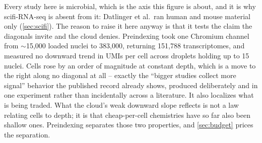 Every study here is microbial, which is the axis this figure is about, and it is
why scifi-RNA-seq is absent from it: Datlinger et al.\ ran human and mouse
material only (\cref{sec:scifi}). The reason to raise it here anyway is that it
tests the claim the diagonals invite and the cloud denies. Preindexing took one
Chromium channel from $\sim$15{,}000 loaded nuclei to 383{,}000, returning
151{,}788 transcriptomes, and measured no downward trend in UMIs per cell across
droplets holding up to 15 nuclei. Cells rose by an order of magnitude at
constant depth, which is a move to the right along no diagonal at all -- exactly
the ``bigger studies collect more signal'' behavior the published record already
shows, produced deliberately and in one experiment rather than incidentally
across a literature. It also localizes what is being traded. What the cloud's
weak downward slope reflects is not a law relating cells to depth; it is that
cheap-per-cell chemistries have so far also been shallow ones. Preindexing
separates those two properties, and \cref{sec:budget} prices the separation.

